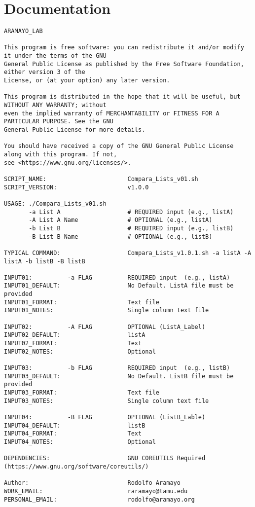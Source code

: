 \documentclass[11pt]{article}
\begin{document}
\section*{Documentation}
\label{sec:orgbddd978}
\begin{verbatim}
ARAMAYO_LAB

This program is free software: you can redistribute it and/or modify it under the terms of the GNU
General Public License as published by the Free Software Foundation, either version 3 of the
License, or (at your option) any later version.

This program is distributed in the hope that it will be useful, but WITHOUT ANY WARRANTY; without
even the implied warranty of MERCHANTABILITY or FITNESS FOR A PARTICULAR PURPOSE. See the GNU
General Public License for more details.

You should have received a copy of the GNU General Public License along with this program. If not,
see <https://www.gnu.org/licenses/>.

SCRIPT_NAME:                       Compara_Lists_v01.sh
SCRIPT_VERSION:                    v1.0.0

USAGE: ./Compara_Lists_v01.sh
       -a List A                   # REQUIRED input (e.g., listA)
       -A List A Name              # OPTIONAL (e.g., listA)
       -b List B                   # REQUIRED input (e.g., listB)
       -B List B Name              # OPTIONAL (e.g., listB)

TYPICAL COMMAND:                   Compara_Lists_v1.0.1.sh -a listA -A listA -b listB -B listB

INPUT01:          -a FLAG          REQUIRED input  (e.g., listA)
INPUT01_DEFAULT:                   No Default. ListA file must be provided
INPUT01_FORMAT:                    Text file
INPUT01_NOTES:                     Single column text file

INPUT02:          -A FLAG          OPTIONAL (ListA_Label)
INPUT02_DEFAULT:                   listA
INPUT02_FORMAT:                    Text
INPUT02_NOTES:                     Optional

INPUT03:          -b FLAG          REQUIRED input  (e.g., listB)
INPUT03_DEFAULT:                   No Default. ListB file must be provided
INPUT03_FORMAT:                    Text file
INPUT03_NOTES:                     Single column text file

INPUT04:          -B FLAG          OPTIONAL (ListB_Lable)
INPUT04_DEFAULT:                   listB
INPUT04_FORMAT:                    Text
INPUT04_NOTES:                     Optional

DEPENDENCIES:                      GNU COREUTILS Required (https://www.gnu.org/software/coreutils/)

Author:                            Rodolfo Aramayo
WORK_EMAIL:                        raramayo@tamu.edu
PERSONAL_EMAIL:                    rodolfo@aramayo.org
\end{verbatim}
\end{document}
